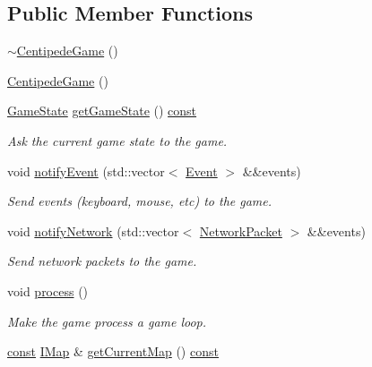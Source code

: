 \subsection*{Public Member Functions}
\begin{DoxyCompactItemize}
\item 
\hyperlink{classarcade_1_1_centipede_game_a64aa08384005ddb8bf7e20f428f6e673}{$\sim$\-Centipede\-Game} ()
\item 
\hyperlink{classarcade_1_1_centipede_game_ab657a35b7e6c2ba40d06e583a4338b9f}{Centipede\-Game} ()
\item 
\hyperlink{namespacearcade_a6adca89ee2f539b03980c7e59b044ed7}{Game\-State} \hyperlink{classarcade_1_1_centipede_game_adc81b3a7d8b3ad4a769233bcc80b3ede}{get\-Game\-State} () \hyperlink{term__entry_8h_a57bd63ce7f9a353488880e3de6692d5a}{const} 
\begin{DoxyCompactList}\small\item\em Ask the current game state to the game. \end{DoxyCompactList}\item 
void \hyperlink{classarcade_1_1_centipede_game_ae3467cae4763f49f4c3db90c9dbf616b}{notify\-Event} (std\-::vector$<$ \hyperlink{structarcade_1_1_event}{Event} $>$ \&\&events)
\begin{DoxyCompactList}\small\item\em Send events (keyboard, mouse, etc) to the game. \end{DoxyCompactList}\item 
void \hyperlink{classarcade_1_1_centipede_game_ad7fa625646fcfc7051c8338ebaa7d41c}{notify\-Network} (std\-::vector$<$ \hyperlink{structarcade_1_1_network_packet}{Network\-Packet} $>$ \&\&events)
\begin{DoxyCompactList}\small\item\em Send network packets to the game. \end{DoxyCompactList}\item 
void \hyperlink{classarcade_1_1_centipede_game_a0516faa09b8bd5019bc676fb8095ebf0}{process} ()
\begin{DoxyCompactList}\small\item\em Make the game process a game loop. \end{DoxyCompactList}\item 
\hyperlink{term__entry_8h_a57bd63ce7f9a353488880e3de6692d5a}{const} \hyperlink{classarcade_1_1_i_map}{I\-Map} \& \hyperlink{classarcade_1_1_centipede_game_a08e07d3f7c64a0ef1dc0ca7782433225}{get\-Current\-Map} () \hyperlink{term__entry_8h_a57bd63ce7f9a353488880e3de6692d5a}{const} 

\end{DoxyCompactItemize}
